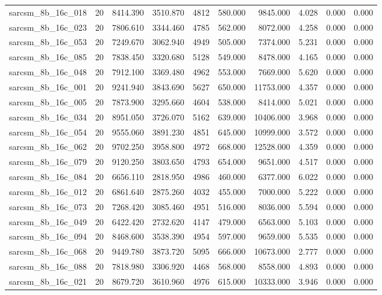 \begin{tabular}{lrrrrrrrrr}
sarcsm\_8b\_16c\_018 & 20 & 8414.390 & 3510.870 & 4812 & 580.000 & 9845.000 & 4.028 & 0.000 & 0.000 \\
sarcsm\_8b\_16c\_023 & 20 & 7806.610 & 3344.460 & 4785 & 562.000 & 8072.000 & 4.258 & 0.000 & 0.000 \\
sarcsm\_8b\_16c\_053 & 20 & 7249.670 & 3062.940 & 4949 & 505.000 & 7374.000 & 5.231 & 0.000 & 0.000 \\
sarcsm\_8b\_16c\_085 & 20 & 7838.450 & 3320.680 & 5128 & 549.000 & 8478.000 & 4.165 & 0.000 & 0.000 \\
sarcsm\_8b\_16c\_048 & 20 & 7912.100 & 3369.480 & 4962 & 553.000 & 7669.000 & 5.620 & 0.000 & 0.000 \\
sarcsm\_8b\_16c\_001 & 20 & 9241.940 & 3843.690 & 5627 & 650.000 & 11753.000 & 4.357 & 0.000 & 0.000 \\
sarcsm\_8b\_16c\_005 & 20 & 7873.900 & 3295.660 & 4604 & 538.000 & 8414.000 & 5.021 & 0.000 & 0.000 \\
sarcsm\_8b\_16c\_034 & 20 & 8951.050 & 3726.070 & 5162 & 639.000 & 10406.000 & 3.968 & 0.000 & 0.000 \\
sarcsm\_8b\_16c\_054 & 20 & 9555.060 & 3891.230 & 4851 & 645.000 & 10999.000 & 3.572 & 0.000 & 0.000 \\
sarcsm\_8b\_16c\_062 & 20 & 9702.250 & 3958.800 & 4972 & 668.000 & 12528.000 & 4.359 & 0.000 & 0.000 \\
sarcsm\_8b\_16c\_079 & 20 & 9120.250 & 3803.650 & 4793 & 654.000 & 9651.000 & 4.517 & 0.000 & 0.000 \\
sarcsm\_8b\_16c\_084 & 20 & 6656.110 & 2818.950 & 4986 & 460.000 & 6377.000 & 6.022 & 0.000 & 0.000 \\
sarcsm\_8b\_16c\_012 & 20 & 6861.640 & 2875.260 & 4032 & 455.000 & 7000.000 & 5.222 & 0.000 & 0.000 \\
sarcsm\_8b\_16c\_073 & 20 & 7268.420 & 3085.460 & 4951 & 516.000 & 8036.000 & 5.594 & 0.000 & 0.000 \\
sarcsm\_8b\_16c\_049 & 20 & 6422.420 & 2732.620 & 4147 & 479.000 & 6563.000 & 5.103 & 0.000 & 0.000 \\
sarcsm\_8b\_16c\_094 & 20 & 8468.600 & 3538.390 & 4954 & 597.000 & 9659.000 & 5.535 & 0.000 & 0.000 \\
sarcsm\_8b\_16c\_068 & 20 & 9449.780 & 3873.720 & 5095 & 666.000 & 10673.000 & 2.777 & 0.000 & 0.000 \\
sarcsm\_8b\_16c\_088 & 20 & 7818.980 & 3306.920 & 4468 & 568.000 & 8558.000 & 4.893 & 0.000 & 0.000 \\
sarcsm\_8b\_16c\_021 & 20 & 8679.720 & 3610.960 & 4976 & 615.000 & 10333.000 & 3.946 & 0.000 & 0.000 \\

\end{tabular}

